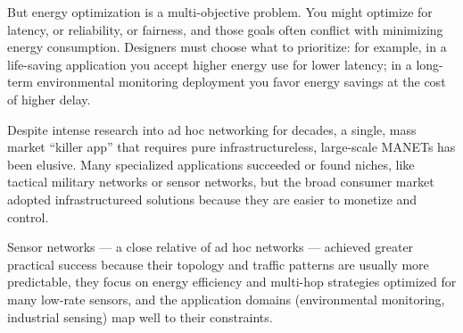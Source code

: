 But energy optimization is a multi-objective problem. You might optimize for latency, or reliability, or fairness, and those goals often conflict with minimizing energy consumption. Designers must choose what to prioritize: for example, in a life-saving application you accept higher energy use for lower latency; in a long-term environmental monitoring deployment you favor energy savings at the cost of higher delay.

Despite intense research into ad hoc networking for decades, a single, mass market “killer app” that requires pure infrastructureless, large-scale MANETs has been elusive. Many specialized applications succeeded or found niches, like tactical military networks or sensor networks, but the broad consumer market adopted infrastructureed solutions because they are easier to monetize and control.

Sensor networks — a close relative of ad hoc networks — achieved greater practical success because their topology and traffic patterns are usually more predictable, they focus on energy efficiency and multi-hop strategies optimized for many low-rate sensors, and the application domains (environmental monitoring, industrial sensing) map well to their constraints.